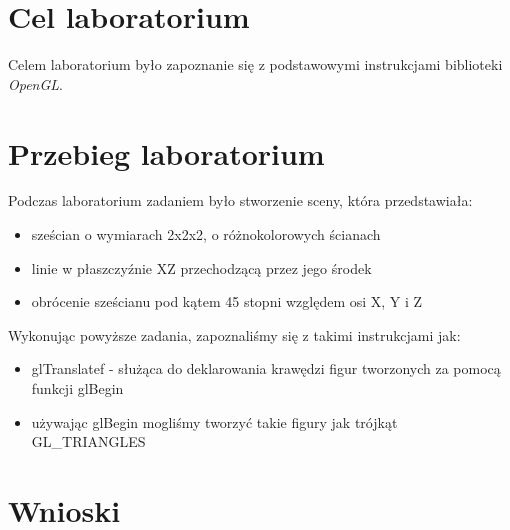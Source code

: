 \documentclass{article}
\begin{document}

\newpage
\section{Cel laboratorium}
Celem laboratorium było zapoznanie się z podstawowymi instrukcjami biblioteki \emph{OpenGL}.
\section{Przebieg laboratorium}
Podczas laboratorium zadaniem było stworzenie sceny, która przedstawiała:
\begin{itemize}
\item sześcian o wymiarach 2x2x2, o różnokolorowych ścianach
\item linie w płaszczyźnie XZ przechodzącą przez jego środek
\item obrócenie sześcianu pod kątem 45 stopni względem osi X, Y i Z
\end{itemize}
Wykonując powyższe zadania, zapoznaliśmy się z takimi instrukcjami jak:
\begin{itemize}
\item \textsf{glTranslatef} - służąca do deklarowania krawędzi figur tworzonych za pomocą funkcji \textsf{glBegin }
\item używając glBegin mogliśmy tworzyć takie figury jak trójkąt GL_TRIANGLES%
\end{itemize}
\section{Wnioski}
\end{document}

